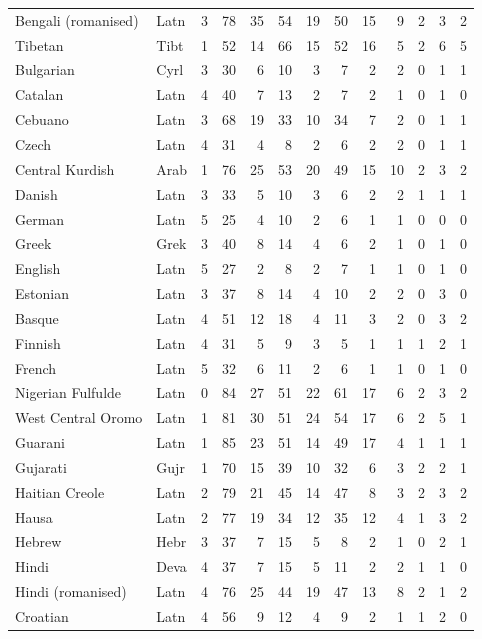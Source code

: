 \begin{small}
\begin{longtable}{llrrrrrrrrrrr}
Bengali (romanised) & Latn & 3 & 78 & 35 & 54 & 19 & 50 & 15 & 9 & 2 & 3 & 2 \\
Tibetan & Tibt & 1 & 52 & 14 & 66 & 15 & 52 & 16 & 5 & 2 & 6 & 5 \\
Bulgarian & Cyrl & 3 & 30 & 6 & 10 & 3 & 7 & 2 & 2 & 0 & 1 & 1 \\
Catalan & Latn & 4 & 40 & 7 & 13 & 2 & 7 & 2 & 1 & 0 & 1 & 0 \\
Cebuano & Latn & 3 & 68 & 19 & 33 & 10 & 34 & 7 & 2 & 0 & 1 & 1 \\
Czech & Latn & 4 & 31 & 4 & 8 & 2 & 6 & 2 & 2 & 0 & 1 & 1 \\
Central Kurdish & Arab & 1 & 76 & 25 & 53 & 20 & 49 & 15 & 10 & 2 & 3 & 2 \\
Danish & Latn & 3 & 33 & 5 & 10 & 3 & 6 & 2 & 2 & 1 & 1 & 1 \\
German & Latn & 5 & 25 & 4 & 10 & 2 & 6 & 1 & 1 & 0 & 0 & 0 \\
Greek & Grek & 3 & 40 & 8 & 14 & 4 & 6 & 2 & 1 & 0 & 1 & 0 \\
English & Latn & 5 & 27 & 2 & 8 & 2 & 7 & 1 & 1 & 0 & 1 & 0 \\
Estonian & Latn & 3 & 37 & 8 & 14 & 4 & 10 & 2 & 2 & 0 & 3 & 0 \\
Basque & Latn & 4 & 51 & 12 & 18 & 4 & 11 & 3 & 2 & 0 & 3 & 2 \\
Finnish & Latn & 4 & 31 & 5 & 9 & 3 & 5 & 1 & 1 & 1 & 2 & 1 \\
French & Latn & 5 & 32 & 6 & 11 & 2 & 6 & 1 & 1 & 0 & 1 & 0 \\
Nigerian Fulfulde & Latn & 0 & 84 & 27 & 51 & 22 & 61 & 17 & 6 & 2 & 3 & 2 \\
West Central Oromo & Latn & 1 & 81 & 30 & 51 & 24 & 54 & 17 & 6 & 2 & 5 & 1 \\
Guarani & Latn & 1 & 85 & 23 & 51 & 14 & 49 & 17 & 4 & 1 & 1 & 1 \\
Gujarati & Gujr & 1 & 70 & 15 & 39 & 10 & 32 & 6 & 3 & 2 & 2 & 1 \\
Haitian Creole & Latn & 2 & 79 & 21 & 45 & 14 & 47 & 8 & 3 & 2 & 3 & 2 \\
Hausa & Latn & 2 & 77 & 19 & 34 & 12 & 35 & 12 & 4 & 1 & 3 & 2 \\
Hebrew & Hebr & 3 & 37 & 7 & 15 & 5 & 8 & 2 & 1 & 0 & 2 & 1 \\
Hindi & Deva & 4 & 37 & 7 & 15 & 5 & 11 & 2 & 2 & 1 & 1 & 0 \\
Hindi (romanised) & Latn & 4 & 76 & 25 & 44 & 19 & 47 & 13 & 8 & 2 & 1 & 2 \\
Croatian & Latn & 4 & 56 & 9 & 12 & 4 & 9 & 2 & 1 & 1 & 2 & 0 \\

\end{longtable}
\end{small}
